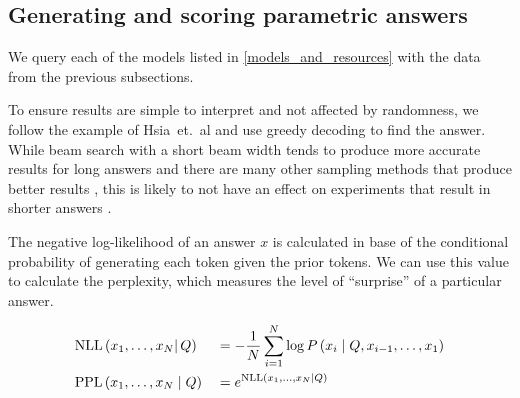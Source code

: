 
\subsection{Generating and scoring parametric answers}
\label{generating_and_scoring}

We query each of the models listed in \cref{models_and_resources} with the data from the previous subsections.

To ensure results are simple to interpret and not affected by randomness, we follow the example of Hsia~et.~al \citep{ragged} and use greedy decoding to find the answer.
While beam search with a short beam width tends to produce more accurate results for long answers \citep{sutskever_seq2seqlearning,wu_mltranslation} and there are many other sampling methods that produce better results \citep{text_degeneration}, this is likely to not have an effect on experiments that result in shorter answers \citep{t5}.

The negative log-likelihood of an answer $x$ is calculated in base of the conditional probability of generating each token given the prior tokens.
We can use this value to calculate the perplexity, which measures the level of ``surprise'' of a particular answer.

\begin{equation}
	\begin{aligned}
		&\text{NLL} \left( x_1, \dots, x_N \right | Q) &&= - \frac{1}{N} \sum^N_{i = 1} \log P \left( x_i \mid Q, x_{i - 1}, \dots, x_1 \right) \\
		&\text{PPL} \left( x_1, \dots, x_N \mid Q \right) &&= e^{\text{NLL} \left(x_1, \dots, x_N \mid Q \right)}
	\end{aligned}
\end{equation}

